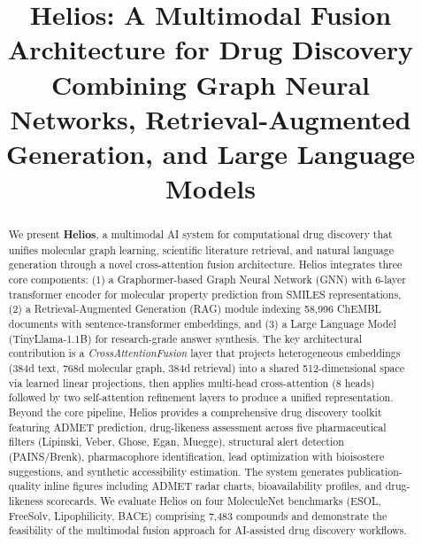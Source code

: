 \documentclass[conference]{IEEEtran}
\begin{document}
\title{Helios: A Multimodal Fusion Architecture for Drug Discovery Combining Graph Neural Networks, Retrieval-Augmented Generation, and Large Language Models}

\author{
}

\maketitle

\begin{abstract}
We present \textbf{Helios}, a multimodal AI system for computational drug discovery that unifies molecular graph learning, scientific literature retrieval, and natural language generation through a novel cross-attention fusion architecture. Helios integrates three core components: (1) a Graphormer-based Graph Neural Network (GNN) with 6-layer transformer encoder for molecular property prediction from SMILES representations, (2) a Retrieval-Augmented Generation (RAG) module indexing 58,996 ChEMBL documents with sentence-transformer embeddings, and (3) a Large Language Model (TinyLlama-1.1B) for research-grade answer synthesis. The key architectural contribution is a \textit{CrossAttentionFusion} layer that projects heterogeneous embeddings (384d text, 768d molecular graph, 384d retrieval) into a shared 512-dimensional space via learned linear projections, then applies multi-head cross-attention (8 heads) followed by two self-attention refinement layers to produce a unified representation. Beyond the core pipeline, Helios provides a comprehensive drug discovery toolkit featuring ADMET prediction, drug-likeness assessment across five pharmaceutical filters (Lipinski, Veber, Ghose, Egan, Muegge), structural alert detection (PAINS/Brenk), pharmacophore identification, lead optimization with bioisostere suggestions, and synthetic accessibility estimation. The system generates publication-quality inline figures including ADMET radar charts, bioavailability profiles, and drug-likeness scorecards. We evaluate Helios on four MoleculeNet benchmarks (ESOL, FreeSolv, Lipophilicity, BACE) comprising 7,483 compounds and demonstrate the feasibility of the multimodal fusion approach for AI-assisted drug discovery workflows.
\end{abstract}
\end{document}
